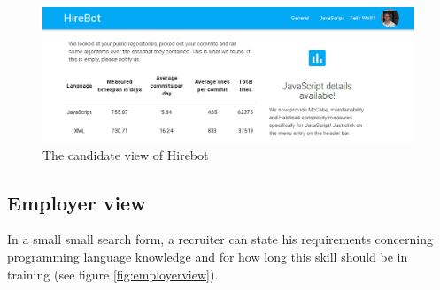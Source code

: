 \begin{figure}
  \includegraphics[width=30em]{gfx/candidateview.png}
  \caption{The candidate view of Hirebot}
  \label{fig:candidateview}
\end{figure}

\subsection{Employer view}
In a small small search form, a recruiter can state his requirements concerning
programming language knowledge and for how long this skill should be in training (see figure \ref{fig:employerview}).
